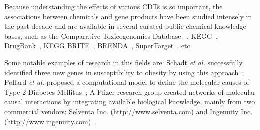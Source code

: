 Because understanding the effects of various CDTs is so important, the associations between chemicals and gene products have been studied intensely in the past decade and are available in several curated public chemical knowledge bases, such as the Comparative Toxicogenomics Database ~\cite{mattingly2006comparative}, KEGG~\cite{Kanehisa:2000},  DrugBank~\cite{law2014drugbank}, KEGG BRITE~\cite{kanehisa2006genomics}, BRENDA~\cite{schomburg2004brenda}, SuperTarget~\cite{gunther2007supertarget}, etc. 


Some notable examples of research in this fields are: Schadt \emph{et al.} successfully identified three new genes in susceptibility to obesity by using this approach~\cite{schadt:2005};
Pollard \emph{et al.} proposed a computational model to define the molecular causes of Type 2 Diabetes Mellitus~\cite{pollard2005computational};  A Pfizer research group created networks of molecular causal interactions by integrating available biological knowledge, mainly from two commercial vendors: Selventa Inc. (\href{http://www.selventa.com}{http://www.selventa.com}) and Ingenuity Inc. (\href{http://www.ingenuity.com}{http://www.ingenuity.com})~\cite{chindelevitch2012causal}.

